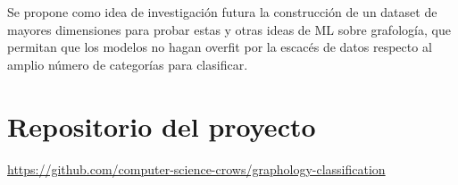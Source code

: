 \documentclass[10pt, a4paper]{article}
\begin{document}
        Se propone como idea de investigaci\'on futura la construcci\'on de un dataset de mayores dimensiones para probar estas y otras ideas de ML sobre grafolog\'ia, que 
        permitan que los modelos no hagan overfit por la escac\'es de datos respecto al amplio n\'umero de categor\'ias para clasificar. 

        \section{Repositorio del proyecto}
		\begin{center}
			\small \url{https://github.com/computer-science-crows/graphology-classification}
		\end{center}

        
        
\end{document}
